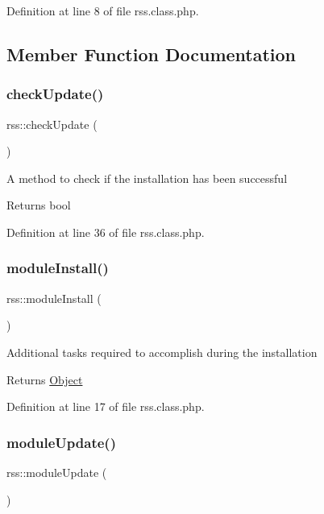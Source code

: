 Definition at line 8 of file rss.\+class.\+php.



\subsection{Member Function Documentation}
\mbox{\label{classrss_abea52ff499087ead7116c986080a685a}} 
\subsubsection{\texorpdfstring{check\+Update()}{checkUpdate()}}
{\footnotesize\ttfamily rss\+::check\+Update (\begin{DoxyParamCaption}{ }\end{DoxyParamCaption})}

A method to check if the installation has been successful \begin{DoxyReturn}{Returns}
bool 
\end{DoxyReturn}


Definition at line 36 of file rss.\+class.\+php.

\mbox{\label{classrss_a6730f54dbfe8b8d31066f3658f02185b}} 
\subsubsection{\texorpdfstring{module\+Install()}{moduleInstall()}}
{\footnotesize\ttfamily rss\+::module\+Install (\begin{DoxyParamCaption}{ }\end{DoxyParamCaption})}

Additional tasks required to accomplish during the installation

\begin{DoxyReturn}{Returns}
\hyperlink{classObject}{Object} 
\end{DoxyReturn}


Definition at line 17 of file rss.\+class.\+php.

\mbox{\label{classrss_a68d8a7c97f3afd095c5ed5c1a304e8e5}} 
\subsubsection{\texorpdfstring{module\+Update()}{moduleUpdate()}}
{\footnotesize\ttfamily rss\+::module\+Update (\begin{DoxyParamCaption}{ }\end{DoxyParamCaption})}

